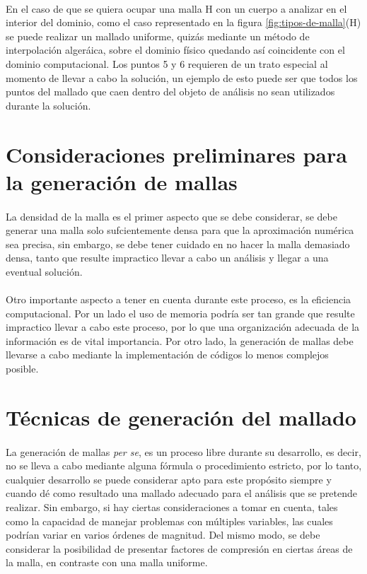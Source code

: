 \documentclass[letterpaper, openright, 12pt]{book}
\begin{document}
			\paragraph*{}
			En el caso de que se quiera ocupar una malla H con un cuerpo a analizar en el interior del dominio, como el caso representado en la figura \ref*{fig:tipos-de-malla}(H) se puede realizar un mallado uniforme, quizás mediante un método de interpolación algeráica, sobre el dominio físico quedando así coincidente con el dominio computacional. Los puntos 5 y 6 requieren de un trato especial al momento de llevar a cabo la solución, un ejemplo de esto puede ser que todos los puntos del mallado que caen dentro del objeto de análisis no sean utilizados durante la solución.
			
	\section{Consideraciones preliminares para la generación de mallas}	
		\paragraph*{}
			La densidad de la malla es el primer aspecto que se debe considerar, se debe generar una malla solo sufcientemente densa para que la aproximación numérica sea precisa, sin embargo, se debe tener cuidado en no hacer la malla demasiado densa, tanto que resulte impractico llevar a cabo un análisis y llegar a una eventual solución.
		\paragraph{}
			 Otro importante aspecto a tener en cuenta durante este proceso, es la eficiencia computacional. Por un lado el uso de memoria podría ser tan grande que resulte impractico llevar a cabo este proceso, por lo que una organización adecuada de la información es de vital importancia. Por otro lado, la generación de mallas debe llevarse a cabo mediante la implementación de códigos lo menos complejos posible.
			
	\section{Técnicas de generación del mallado}
		\paragraph*{}
			La generación de mallas \textit{per se}, es un proceso libre durante su desarrollo, es decir, no se lleva a cabo mediante alguna fórmula o procedimiento estricto, por lo tanto, cualquier desarrollo se puede considerar apto para este propósito siempre y cuando dé como resultado una mallado adecuado para el análisis que se pretende realizar. Sin embargo, si hay ciertas consideraciones a tomar en cuenta, tales como la capacidad de manejar problemas con múltiples variables, las cuales podrían variar en varios órdenes de magnitud. Del mismo modo, se debe considerar la posibilidad de presentar factores de compresión en ciertas áreas de la malla, en contraste con una malla uniforme.
			
\end{document}

